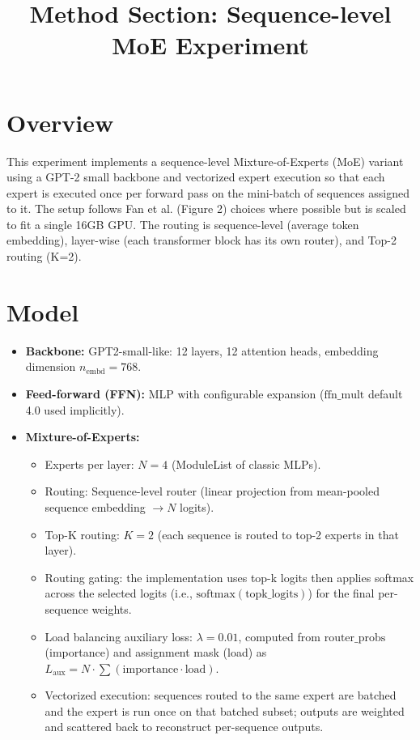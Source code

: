 \documentclass{article}
\title{Method Section: Sequence-level MoE Experiment}
\author{}
\date{}
\begin{document}
\maketitle

\section{Overview}
This experiment implements a sequence-level Mixture-of-Experts (MoE) variant using a GPT-2 small backbone and vectorized expert execution so that each expert is executed once per forward pass on the mini-batch of sequences assigned to it. The setup follows Fan et al. (Figure 2) choices where possible but is scaled to fit a single 16GB GPU. The routing is sequence-level (average token embedding), layer-wise (each transformer block has its own router), and Top-2 routing (K=2).

\section{Model}
\begin{itemize}
    \item \textbf{Backbone:} GPT2-small-like: 12 layers, 12 attention heads, embedding dimension $n_{\text{embd}}=768$.
    \item \textbf{Feed-forward (FFN):} MLP with configurable expansion ($\text{ffn\_mult}$ default 4.0 used implicitly).
    \item \textbf{Mixture-of-Experts:}
    \begin{itemize}
        \item Experts per layer: $N = 4$ (ModuleList of classic MLPs).
        \item Routing: Sequence-level router (linear projection from mean-pooled sequence embedding $\to N$ logits).
        \item Top-K routing: $K = 2$ (each sequence is routed to top-2 experts in that layer).
        \item Routing gating: the implementation uses top-k logits then applies softmax across the selected logits (i.e., $\text{softmax}(\text{topk\_logits})$) for the final per-sequence weights.
        \item Load balancing auxiliary loss: $\lambda = 0.01$, computed from $\text{router\_probs}$ (importance) and assignment mask (load) as $L_{\text{aux}} = N \cdot \sum(\text{importance} \cdot \text{load})$.
        \item Vectorized execution: sequences routed to the same expert are batched and the expert is run once on that batched subset; outputs are weighted and scattered back to reconstruct per-sequence outputs.
    \end{itemize}
\end{itemize}
\end{document}
